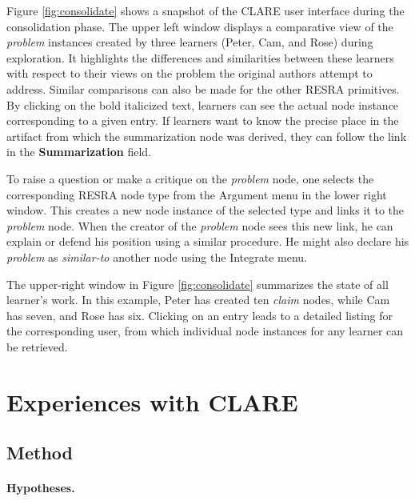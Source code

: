 Figure \ref{fig:consolidate} shows a snapshot of the CLARE user interface
during the consolidation phase. The upper left window displays a
comparative view of the {\em problem\/} instances created by three learners
(Peter, Cam, and Rose) during exploration. It highlights the differences
and similarities between these learners with respect to their views on the
problem the original authors attempt to address. Similar comparisons can
also be made for the other RESRA primitives. By clicking on the bold
italicized text, learners can see the actual node instance corresponding to
a given entry. If learners want to know the precise place in the artifact
from which the summarization node was derived, they can follow the link in
the {\bf Summarization} field.

\begin{quotation}
\end{quotation}

To raise a question or make a critique on the {\em problem} node, one
selects the corresponding RESRA node type from the {\sf Argument\/} menu in
the lower right window. This creates a new node instance of the selected type and
links it to the {\em problem} node.  When the creator of the {\em problem}
node sees this new link, he can explain or defend his position using a
similar procedure. He might also declare his {\em problem} as {\sl
similar-to\/} another node using the {\sf Integrate\/} menu.

The upper-right window in Figure \ref{fig:consolidate} summarizes the state
of all learner's work. In this example, Peter has created ten {\em claim}
nodes, while Cam has seven, and Rose has six. Clicking on an entry
leads to a detailed listing for the corresponding user, from which
individual node instances for any learner can be retrieved.

\section{Experiences with CLARE}
\label{sec:findings}

\subsection{Method}

\paragraph{Hypotheses.}

